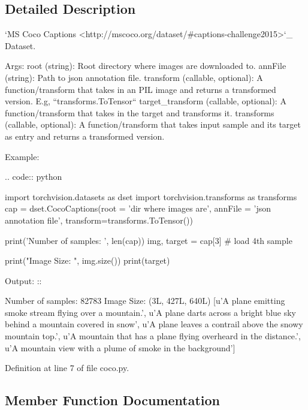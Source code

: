 \subsection{Detailed Description}
\begin{DoxyVerb}`MS Coco Captions <http://mscoco.org/dataset/#captions-challenge2015>`_ Dataset.

Args:
    root (string): Root directory where images are downloaded to.
    annFile (string): Path to json annotation file.
    transform (callable, optional): A function/transform that  takes in an PIL image
        and returns a transformed version. E.g, ``transforms.ToTensor``
    target_transform (callable, optional): A function/transform that takes in the
        target and transforms it.
    transforms (callable, optional): A function/transform that takes input sample and its target as entry
        and returns a transformed version.

Example:

    .. code:: python

        import torchvision.datasets as dset
        import torchvision.transforms as transforms
        cap = dset.CocoCaptions(root = 'dir where images are',
                                annFile = 'json annotation file',
                                transform=transforms.ToTensor())

        print('Number of samples: ', len(cap))
        img, target = cap[3] # load 4th sample

        print("Image Size: ", img.size())
        print(target)

    Output: ::

        Number of samples: 82783
        Image Size: (3L, 427L, 640L)
        [u'A plane emitting smoke stream flying over a mountain.',
        u'A plane darts across a bright blue sky behind a mountain covered in snow',
        u'A plane leaves a contrail above the snowy mountain top.',
        u'A mountain that has a plane flying overheard in the distance.',
        u'A mountain view with a plume of smoke in the background']\end{DoxyVerb}
 

Definition at line 7 of file coco.\+py.



\subsection{Member Function Documentation}
\mbox{\label{classtorchvision_1_1datasets_1_1coco_1_1CocoCaptions_a801a9385cb606e4941cfcd4ebf5555db}} 
